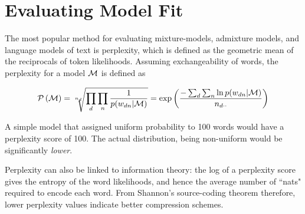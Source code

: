 %
%


\section{Evaluating Model Fit}
\label{sec:chap1:eval}

The most popular method for evaluating mixture-models, admixture models, and language models of text is perplexity, which is defined as the geometric mean of the reciprocals of token likelihoods. Assuming exchangeability of words, the perplexity for a model $\mathcal{M}$ is defined as

\begin{align}
\mathcal{P} \left( { \mathcal{M} } \right) = \sqrt[n_{d}]{\prod_d \prod_n \frac{1}{p(w_{dn}|\mathcal{M})}} = \exp \left( \frac{-\sum_d \sum_n \ln p(w_{dn}|\mathcal{M})}{n_{d\cdot\cdot}} \right) \label{eqn:perp_def}
\end{align}

A simple model that assigned uniform probability to 100 words would have a perplexity score of 100\cite{Goodman2001}. The actual distribution, being non-uniform would be significantly \emph{lower}. 

Perplexity can also be linked to information theory: the log of a perplexity score gives the entropy of the word likelihoods, and hence the average number of ``nats" required to encode each word. From Shannon's source-coding theorem therefore, lower perplexity values indicate better compression schemes.

